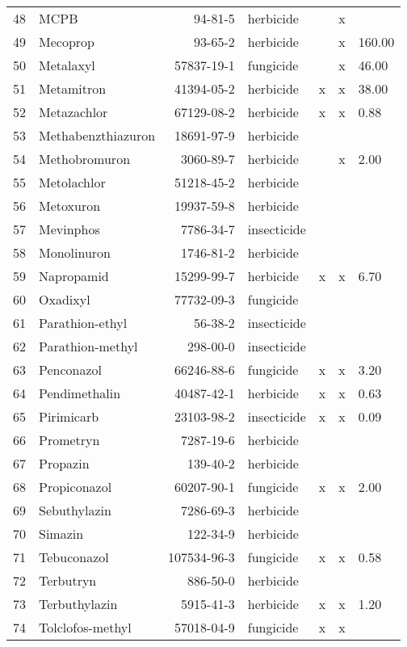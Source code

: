\begin{longtable}{lp{3cm}rlp{0.5cm}p{0.5cm}p{1cm}}
  48 & MCPB & 94-81-5 & herbicide &  & x &  \\ 
  49 & Mecoprop & 93-65-2 & herbicide &  & x & 160.00 \\ 
  50 & Metalaxyl & 57837-19-1 & fungicide &  & x & 46.00 \\ 
  51 & Metamitron & 41394-05-2 & herbicide & x & x & 38.00 \\ 
  52 & Metazachlor & 67129-08-2 & herbicide & x & x & 0.88 \\ 
  53 & Methabenzthiazuron & 18691-97-9 & herbicide &  &  &  \\ 
  54 & Methobromuron & 3060-89-7 & herbicide &  & x & 2.00 \\ 
  55 & Metolachlor & 51218-45-2 & herbicide &  &  &  \\ 
  56 & Metoxuron & 19937-59-8 & herbicide &  &  &  \\ 
  57 & Mevinphos & 7786-34-7 & insecticide &  &  &  \\ 
  58 & Monolinuron & 1746-81-2 & herbicide &  &  &  \\ 
  59 & Napropamid & 15299-99-7 & herbicide & x & x & 6.70 \\ 
  60 & Oxadixyl & 77732-09-3 & fungicide &  &  &  \\ 
  61 & Parathion-ethyl & 56-38-2 & insecticide &  &  &  \\ 
  62 & Parathion-methyl & 298-00-0 & insecticide &  &  &  \\ 
  63 & Penconazol & 66246-88-6 & fungicide & x & x & 3.20 \\ 
  64 & Pendimethalin & 40487-42-1 & herbicide & x & x & 0.63 \\ 
  65 & Pirimicarb & 23103-98-2 & insecticide & x & x & 0.09 \\ 
  66 & Prometryn & 7287-19-6 & herbicide &  &  &  \\ 
  67 & Propazin & 139-40-2 & herbicide &  &  &  \\ 
  68 & Propiconazol & 60207-90-1 & fungicide & x & x & 2.00 \\ 
  69 & Sebuthylazin & 7286-69-3 & herbicide &  &  &  \\ 
  70 & Simazin & 122-34-9 & herbicide &  &  &  \\ 
  71 & Tebuconazol & 107534-96-3 & fungicide & x & x & 0.58 \\ 
  72 & Terbutryn & 886-50-0 & herbicide &  &  &  \\ 
  73 & Terbuthylazin & 5915-41-3 & herbicide & x & x & 1.20 \\ 
  74 & Tolclofos-methyl & 57018-04-9 & fungicide & x & x &  \\ 

\end{longtable}

